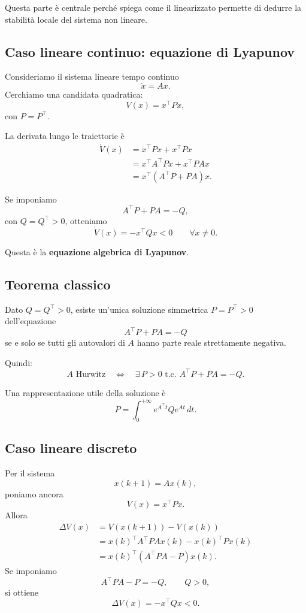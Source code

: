 Questa parte \`e centrale perch\'e spiega come il linearizzato permette di dedurre la stabilit\`a locale del sistema non lineare.

\subsection{Caso lineare continuo: equazione di Lyapunov}

Consideriamo il sistema lineare tempo continuo
\[
\dot x = Ax.
\]
Cerchiamo una candidata quadratica:
\[
V(x)=x^\top P x,
\]
con \(P=P^\top\).

La derivata lungo le traiettorie \`e
\begin{align*}
\dot V(x)
&= \dot x^\top P x + x^\top P \dot x\\
&= x^\top A^\top P x + x^\top P A x\\
&= x^\top (A^\top P + PA)x.
\end{align*}

Se imponiamo
\[
A^\top P + PA = -Q,
\]
con \(Q=Q^\top>0\), otteniamo
\[
\dot V(x) = -x^\top Q x <0 \qquad \forall x\neq 0.
\]

Questa \`e la \textbf{equazione algebrica di Lyapunov}.

\subsection{Teorema classico}

Dato \(Q=Q^\top>0\), esiste un'unica soluzione simmetrica \(P=P^\top>0\) dell'equazione
\[
A^\top P + PA = -Q
\]
se e solo se tutti gli autovalori di \(A\) hanno parte reale strettamente negativa.

Quindi:
\[
A \text{ Hurwitz}
\quad \Longleftrightarrow \quad
\exists\, P>0 \text{ t.c. } A^\top P + PA = -Q.
\]

\medskip

\noindent
Una rappresentazione utile della soluzione \`e
\[
P=\int_0^{+\infty} e^{A^\top t} Q e^{At}\,dt.
\]

\subsection{Caso lineare discreto}

Per il sistema
\[
x(k+1)=Ax(k),
\]
poniamo ancora
\[
V(x)=x^\top P x.
\]
Allora
\begin{align*}
\Delta V(x)
&=V(x(k+1))-V(x(k))\\
&=x(k)^\top A^\top P A x(k) - x(k)^\top P x(k)\\
&=x(k)^\top (A^\top P A - P)x(k).
\end{align*}
Se imponiamo
\[
A^\top P A - P = -Q,
\qquad Q>0,
\]
si ottiene
\[
\Delta V(x) = -x^\top Q x <0.
\]

